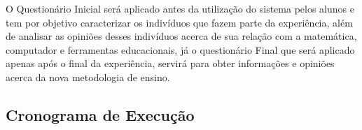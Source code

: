 O Questionário Inicial será aplicado antes da utilização do sistema pelos alunos e tem por objetivo caracterizar os indivíduos que fazem parte da experiência, além de analisar as opiniões desses indivíduos acerca de sua relação com a matemática, computador e ferramentas educacionais, já o questionário Final que será aplicado apenas após o final da experiência, servirá para obter informações e opiniões acerca da nova metodologia de ensino.


\subsection{Cronograma de Execução}


